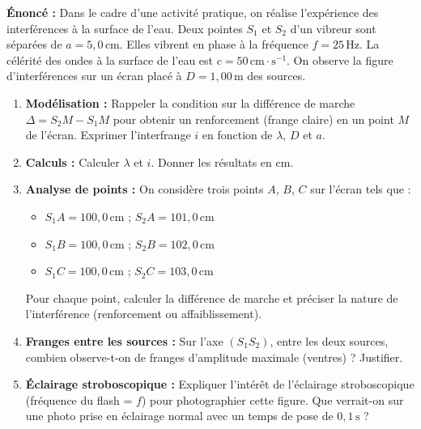\documentclass[11pt]{article}
\begin{document}
\begin{exercice}
\textbf{Énoncé :} Dans le cadre d'une activité pratique, on réalise l'expérience des interférences à la surface de l'eau. Deux pointes $S_1$ et $S_2$ d'un vibreur sont séparées de $a = 5,0\,\text{cm}$. Elles vibrent en phase à la fréquence $f = 25\,\text{Hz}$. La célérité des ondes à la surface de l'eau est $c = 50\,\text{cm}\cdot\text{s}^{-1}$. On observe la figure d'interférences sur un écran placé à $D = 1,00\,\text{m}$ des sources.

\begin{enumerate}
    \item \textbf{Modélisation :} Rappeler la condition sur la différence de marche $\Delta = S_2M - S_1M$ pour obtenir un renforcement (frange claire) en un point $M$ de l'écran. Exprimer l'interfrange $i$ en fonction de $\lambda$, $D$ et $a$.
    \item \textbf{Calculs :} Calculer $\lambda$ et $i$. Donner les résultats en $\text{cm}$.
    \item \textbf{Analyse de points :} On considère trois points $A$, $B$, $C$ sur l'écran tels que :
    \begin{itemize}
        \item $S_1A = 100,0\,\text{cm}$ ; $S_2A = 101,0\,\text{cm}$
        \item $S_1B = 100,0\,\text{cm}$ ; $S_2B = 102,0\,\text{cm}$
        \item $S_1C = 100,0\,\text{cm}$ ; $S_2C = 103,0\,\text{cm}$
    \end{itemize}
    Pour chaque point, calculer la différence de marche et préciser la nature de l'interférence (renforcement ou affaiblissement).
    \item \textbf{Franges entre les sources :} Sur l'axe $(S_1S_2)$, entre les deux sources, combien observe-t-on de franges d'amplitude maximale (ventres) ? Justifier.
    \item \textbf{Éclairage stroboscopique :} Expliquer l'intérêt de l'éclairage stroboscopique (fréquence du flash = $f$) pour photographier cette figure. Que verrait-on sur une photo prise en éclairage normal avec un temps de pose de $0,1\,\text{s}$ ?
\end{enumerate}
\end{exercice}
\end{document}
